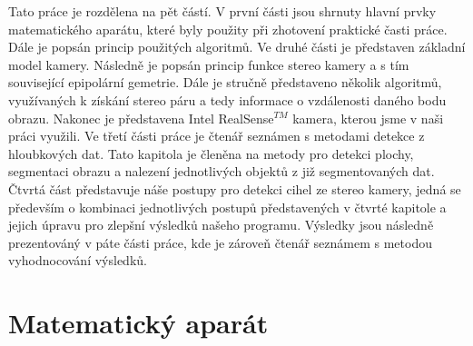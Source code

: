\documentclass[twoside]{ctuthesis}
\begin{document}
Tato práce je rozdělena na pět částí. V první části jsou shrnuty hlavní prvky matematického aparátu, které byly použity při zhotovení praktické časti práce. Dále je popsán princip použitých algoritmů.  Ve druhé části je představen základní model kamery. Následně je popsán princip funkce stereo kamery a s tím související epipolární gemetrie. Dále je stručně představeno několik algoritmů, využívaných k získání stereo páru a tedy informace o vzdálenosti daného bodu obrazu. Nakonec je představena Intel\textregistered{} RealSense$^{TM}$ kamera, kterou jsme v naši práci využili.
Ve třetí části práce je čtenář seznámen s metodami detekce z hloubkových dat. Tato kapitola je členěna na metody pro detekci plochy, segmentaci obrazu a nalezení jednotlivých objektů z již segmentovaných dat.
Čtvrtá část představuje náše postupy pro detekci cihel ze stereo kamery, jedná se především o kombinaci jednotlivých postupů představených v čtvrté kapitole a jejich úpravu pro zlepšní výsledků našeho programu. Výsledky jsou následně prezentováný v páte části práce, kde je zároveň čtenář seznámem s metodou vyhodnocování výsledků.

\chapter{Matematický aparát}
\end{document}
